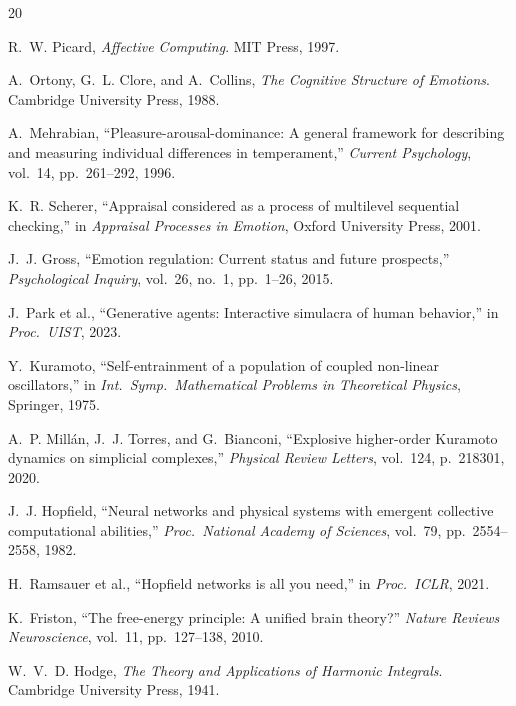 \documentclass[11pt]{article}
\begin{document}

\begin{thebibliography}{20}

R.~W. Picard, \emph{Affective Computing}. MIT Press, 1997.

A.~Ortony, G.~L. Clore, and A.~Collins, \emph{The Cognitive Structure of Emotions}. Cambridge University Press, 1988.

A.~Mehrabian, ``Pleasure-arousal-dominance: A general framework for describing and measuring individual differences in temperament,'' \emph{Current Psychology}, vol.~14, pp.~261--292, 1996.

K.~R. Scherer, ``Appraisal considered as a process of multilevel sequential checking,'' in \emph{Appraisal Processes in Emotion}, Oxford University Press, 2001.

J.~J. Gross, ``Emotion regulation: Current status and future prospects,'' \emph{Psychological Inquiry}, vol.~26, no.~1, pp.~1--26, 2015.

J.~Park et al., ``Generative agents: Interactive simulacra of human behavior,'' in \emph{Proc.\ UIST}, 2023.

Y.~Kuramoto, ``Self-entrainment of a population of coupled non-linear oscillators,'' in \emph{Int.\ Symp.\ Mathematical Problems in Theoretical Physics}, Springer, 1975.

A.~P. Mill\'an, J.~J. Torres, and G.~Bianconi, ``Explosive higher-order Kuramoto dynamics on simplicial complexes,'' \emph{Physical Review Letters}, vol.~124, p.~218301, 2020.

J.~J. Hopfield, ``Neural networks and physical systems with emergent collective computational abilities,'' \emph{Proc.\ National Academy of Sciences}, vol.~79, pp.~2554--2558, 1982.

H.~Ramsauer et al., ``Hopfield networks is all you need,'' in \emph{Proc.\ ICLR}, 2021.

K.~Friston, ``The free-energy principle: A unified brain theory?'' \emph{Nature Reviews Neuroscience}, vol.~11, pp.~127--138, 2010.

W.~V.~D. Hodge, \emph{The Theory and Applications of Harmonic Integrals}. Cambridge University Press, 1941.


\end{thebibliography}
\end{document}
